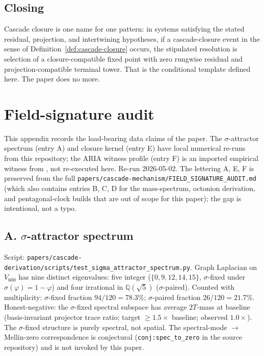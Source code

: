 \documentclass[11pt]{article}
\theoremstyle{definition}
\newcommand{\Q}{\mathbb{Q}}
\newcommand{\pphi}{\varphi}
\newcommand{\Vsub}{V_{600}}
\begin{document}
\subsection{Closing}

Cascade closure is one name for one pattern: in systems satisfying
the stated residual, projection, and intertwining hypotheses, if a
cascade-closure event in the sense of
Definition~\ref{def:cascade-closure} occurs, the stipulated
resolution is selection of a closure-compatible fixed point with
zero rungwise residual and projection-compatible terminal tower.
That is the conditional template defined here. The paper does no more.

\appendix

\section{Field-signature audit}\label{app:field-signature-audit}

This appendix records the load-bearing data claims of the paper. The
$\sigma$-attractor spectrum (entry A) and closure kernel (entry E)
have local numerical re-runs from this repository; the ARIA witness
profile (entry F) is an imported empirical witness from
\cite{SmartARIAChess}, not re-executed here. Re-run 2026-05-02.
The lettering A, E, F is preserved from the full
\texttt{papers/cascade-mechanism/FIELD\_SIGNATURE\_AUDIT.md} (which
also contains entries B, C, D for the mass-spectrum, octonion
derivation, and pentagonal-clock builds that are out of scope for
this paper); the gap is intentional, not a typo.

\subsection*{A. \texorpdfstring{$\sigma$}{sigma}-attractor spectrum}\label{app:fsa-A}
Script: \texttt{papers/cascade-derivation/scripts/test\_sigma\_attractor\_spectrum.py}.
Graph Laplacian on $\Vsub$ has nine distinct eigenvalues: five
integer ($\{0, 9, 12, 14, 15\}$, $\sigma$-fixed under
$\sigma(\pphi) = 1 - \pphi$) and four irrational in $\Q(\sqrt{5})$
($\sigma$-paired). Counted with multiplicity: $\sigma$-fixed fraction
$94/120 = 78.3\%$; $\sigma$-paired fraction $26/120 = 21.7\%$.
Honest-negative: the $\sigma$-fixed spectral subspace has average
$2T$-mass at baseline (basis-invariant projector trace ratio; target
$\geq 1.5\times$ baseline; observed $1.0\times$). The $\sigma$-fixed
structure is purely spectral, not spatial. The
spectral-mode $\to$ Mellin-zero correspondence is conjectural
(\texttt{conj:spec\_to\_zero} in the source repository) and is not
invoked by this paper.
\end{document}
